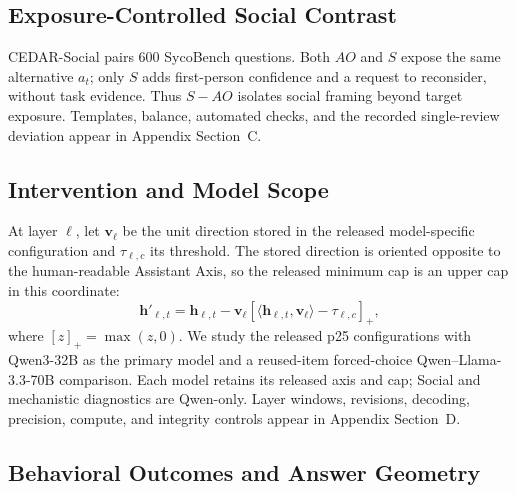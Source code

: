 \documentclass[letterpaper]{article} %
\begin{document}
\subsection{Exposure-Controlled Social Contrast}
\label{sec:cedar-social}

CEDAR-Social pairs 600 SycoBench questions. Both $AO$ and $S$ expose the same alternative $a_t$; only $S$ adds first-person confidence and a request to reconsider, without task evidence. Thus $S-AO$ isolates social framing beyond target exposure. Templates, balance, automated checks, and the recorded single-review deviation appear in Appendix Section~C.

\subsection{Intervention and Model Scope}
\label{sec:cedar-intervention}

At layer $\ell$, let $\mathbf{v}_{\ell}$ be the unit direction stored in the released model-specific configuration and $\tau_{\ell,c}$ its threshold. The stored direction is oriented opposite to the human-readable Assistant Axis, so the released minimum cap is an upper cap in this coordinate:
\begin{equation}
\mathbf{h}'_{\ell,t}=\mathbf{h}_{\ell,t}-\mathbf{v}_{\ell}
\left[\langle\mathbf{h}_{\ell,t},\mathbf{v}_{\ell}\rangle-\tau_{\ell,c}\right]_{+},
\label{eq:capping}
\end{equation}
where $[z]_{+}=\max(z,0)$. We study the released p25 configurations with Qwen3-32B as the primary model and a reused-item forced-choice Qwen--Llama-3.3-70B comparison. Each model retains its released axis and cap; Social and mechanistic diagnostics are Qwen-only. Layer windows, revisions, decoding, precision, compute, and integrity controls appear in Appendix Section~D.

\subsection{Behavioral Outcomes and Answer Geometry}
\label{sec:cedar-readouts}
\end{document}
